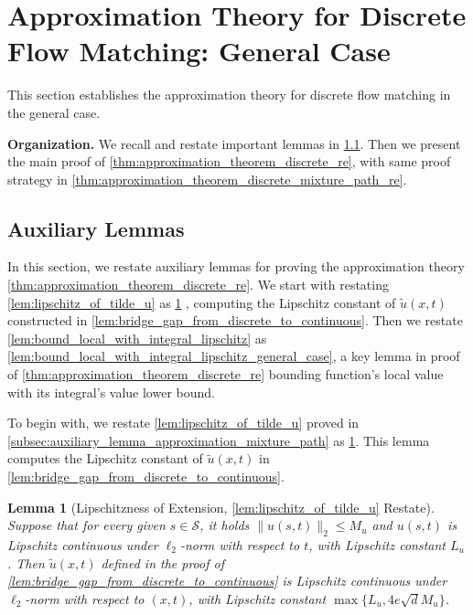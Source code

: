 \documentclass[12pt]{article}
\numberwithin{equation}{section}
\let\tilde\widetilde
\newcommand{\wt}{\widetilde}
\renewcommand{\tilde}{\wt}
\theoremstyle{theoremstyle}
\newtheorem{lemma}{Lemma}[section]
\numberwithin{equation}{section}
\numberwithin{theorem}{section}
\numberwithin{proposition}{section}
\numberwithin{definition}{section}
\numberwithin{lemma}{section}
\numberwithin{assumption}{section}
\numberwithin{remark}{section}
\begin{document}
\clearpage
\clearpage


\section{Approximation Theory for Discrete Flow Matching: General Case}
\label{sec:approx_dfm_general}

This section establishes the approximation theory for discrete flow matching in the general case. 

\textbf{Organization.}
We recall and restate important lemmas in \cref{sec:auxiliary_lemmas_approximation}.
Then we present the main proof of \cref{thm:approximation_theorem_discrete_re}, with same proof strategy in \cref{thm:approximation_theorem_discrete_mixture_path_re}.

\subsection{Auxiliary Lemmas}
\label{sec:auxiliary_lemmas_approximation}

In this section, we restate auxiliary lemmas for proving the approximation theory \cref{thm:approximation_theorem_discrete_re}.
We start with restating  \cref{lem:lipschitz_of_tilde_u} as \cref{lem:lipschitz_of_tilde_u_general_case} , computing the Lipschitz constant of $\tilde{u}(x,t)$ constructed in \cref{lem:bridge_gap_from_discrete_to_continuous}.
Then we restate \cref{lem:bound_local_with_integral_lipschitz} as \cref{lem:bound_local_with_integral_lipschitz_general_case}, a key lemma in proof of \cref{thm:approximation_theorem_discrete_re} bounding function’s local value with its integral’s value lower bound.

To begin with, we restate \cref{lem:lipschitz_of_tilde_u} proved in \cref{subsec:auxiliary_lemma_approximation_mixture_path} as \cref{lem:lipschitz_of_tilde_u_general_case}.
This lemma computes the Lipschitz constant of $\tilde{u}(x,t)$ in \cref{lem:bridge_gap_from_discrete_to_continuous}.

\begin{lemma}[Lipschitzness of Extension, \cref{lem:lipschitz_of_tilde_u} Restate]\label{lem:lipschitz_of_tilde_u_general_case}
Suppose that for every given $s\in \mathcal{S}$, it holds $\|u(s,t)\|_2\leq M_u$ and $u(s,t)$ is Lipschitz continuous under $\ell_2$-norm with respect to $t$, with Lipschitz constant $L_u$. 
Then $\tilde{u}(x,t)$ defined in the proof of \cref{lem:bridge_gap_from_discrete_to_continuous} is Lipschitz continuous under $\ell_2$-norm with respect to $(x,t)$, with Lipschitz constant $\max\{L_u,4e\sqrt{d}M_u\}$. 
\end{lemma}
\end{document}
